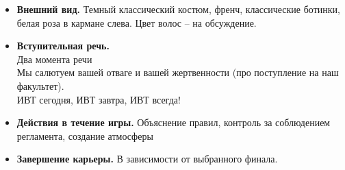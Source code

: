 
\begin{itemize}
\item \textbf{Внешний вид.} Темный классический костюм, френч, классические ботинки, белая роза в кармане слева. Цвет волос -- на обсуждение.

\item \textbf{Вступительная речь.}\\
Два момента речи\\
Мы салютуем вашей отваге и вашей жертвенности (про поступление на наш факультет).\\
ИВТ сегодня, ИВТ завтра, ИВТ всегда!

\item \textbf{Действия в течение игры.} Объяснение правил, контроль за соблюдением регламента, создание атмосферы

\item \textbf{Завершение карьеры.} В зависимости от выбранного финала.
\end{itemize}